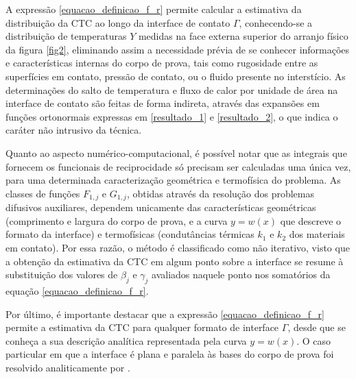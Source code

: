 A expressão \eqref{equacao_definicao_f_r} permite calcular a estimativa da distribuição da CTC ao longo da interface de contato $\Gamma$, conhecendo-se
a distribuição de temperaturas $Y$ medidas na face externa superior do arranjo físico da figura \ref{fig2}, eliminando assim a necessidade prévia de
se conhecer informações e características internas do corpo de prova, tais como rugosidade entre as superfícies em contato, pressão de contato, ou
o fluido presente no interstício. As determinações do salto de temperatura e fluxo de calor por unidade de área na interface de contato são feitas de forma indireta, através
das expansões em funções ortonormais expressas em \eqref{resultado_1} e \eqref{resultado_2}, o que indica o caráter não intrusivo da técnica.

Quanto ao aspecto numérico-computacional, é possível notar que as integrais que fornecem os funcionais de reciprocidade só precisam ser calculadas
uma única vez, para uma determinada caracterização geométrica e termofísica do problema. As classes de funções $F_{1,j}$ e $G_{1,j}$, obtidas através da resolução dos
problemas difusivos auxiliares, dependem unicamente das
características geométricas (comprimento e largura do corpo de prova, e a curva $y = w(x)$ que descreve o formato da interface)
e termofísicas (condutâncias térmicas $k_1$ e $k_2$ dos materiais em contato). Por essa razão, o método é classificado como não iterativo, visto que
a obtenção da estimativa da CTC em algum ponto sobre a interface se resume à substituição dos valores de $\beta_j$ e $\gamma_j$ avaliados naquele
ponto nos somatórios da equação \eqref{equacao_definicao_f_r}.

Por último, é importante destacar que a expressão \eqref{equacao_definicao_f_r} permite a estimativa da CTC para qualquer formato de interface $\Gamma$,
desde que se conheça a sua descrição analítica representada pela curva $y = w(x)$. O caso particular em que a interface é plana e paralela às bases do corpo
de prova foi resolvido analiticamente por \cite{tese_padilha}.

